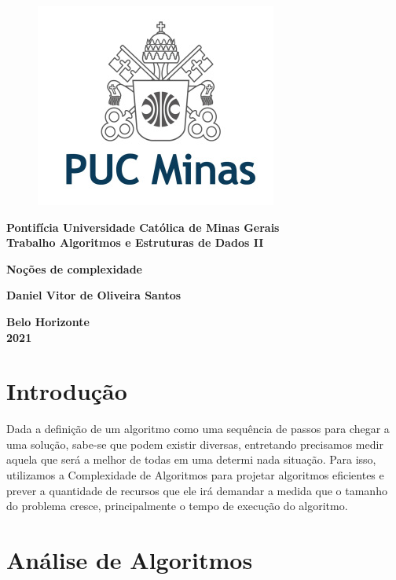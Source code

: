 \documentclass[a4paper, 12pt, fleqn, leqno]{article}
\begin{document}
\thispagestyle{empty}

\begin{figure}[h!b]
\centering \includegraphics[scale=2.5]{logopuc.jpg}
\end{figure}

\begin{center}
{\Large \bf Pontifícia Universidade Católica de Minas Gerais} \\
{\large \bf Trabalho Algoritmos e Estruturas de Dados II}

\vspace{3 cm}

{\Large \bf Noções de complexidade}

\vspace{4.5 cm}

{\Large \bf Daniel Vitor de Oliveira Santos}

\vspace{6.5cm}

{\large \bf Belo Horizonte \\ 2021}

\end{center}

\section{Introdução}
	
		Dada a definição de um algoritmo como uma sequência de passos para chegar a uma solução, sabe-se que
podem existir diversas, entretando precisamos medir aquela que será a melhor de todas em uma determi
nada situação. Para isso, utilizamos a Complexidade de Algoritmos para projetar algoritmos eficientes
e prever a quantidade de recursos que ele irá demandar a medida que o tamanho do problema cresce, principalmente
o tempo de execução do algoritmo.

\section{Análise de Algoritmos}
		
\end{document}
